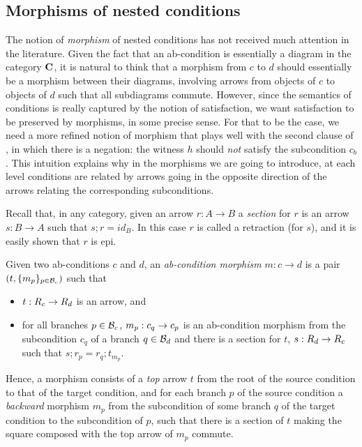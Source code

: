 \subsection{Morphisms of nested conditions}
\medskip\noindent The notion of \emph{morphism} of nested conditions has not received much attention in the literature. Given the fact that an ab-condition is essentially a diagram in the category $\mathbf{C}$, it is natural to think that a morphism from $c$ to $d$ should essentially be a morphism between their diagrams, involving arrows from objects of $c$ to objects of $d$ such that all subdiagrams commute. However, since the semantics of conditions is really captured by the notion of satisfaction, we want satisfaction to be preserved by morphisms, in some precise sense. For that to be the case, we need a more refined notion of morphism that plays well with the second clause of , in which there is a negation: the witness $h$ should \emph{not} satisfy the subcondition $c_b$. 
This intuition explains why in the morphisms we are going to introduce, at each level conditions are related by arrows going in the opposite direction of the arrows relating the corresponding subconditions.  

Recall that, in any category, given an arrow $r: A \to B$ a \emph{section} for $r$ is an arrow $s: B \to A$ such that $s;r = id_B$. In this case $r$ is called a retraction (for $s$), and it is easily shown that $r$ is epi.

\begin{definition}
  Given two ab-conditions $c$ and $d$, an \emph{ab-condition morphism} $m: c \to d$
  is a pair $(t,\{{m_p}\}_{p\in \mathcal{B}_c})$ such that   
  \begin{itemize}
    \item $t:R_c\rightarrow R_d$ is an arrow, and 
  \item  for all branches $p\in \mathcal{B}_c$, $m_p:c_q\rightarrow c_p$ is an ab-condition morphism from the subcondition $c_q$ of a branch $q\in \mathcal{B}_d$ and there is a section for $t$, $s:R_d\rightarrow R_c$ such that $s; r_p = r_q;t_{m_p}$.
  \end{itemize}
\end{definition}
%
Hence, a morphism consists of a \emph{top} arrow $t$ from the root of the source condition to that of the target condition, and for each branch $p$ of the source condition a \emph{backward} morphism $m_p$ from the subcondition of some branch $q$ of the target condition to the subcondition of $p$, such that there is a section of $t$ making the square composed with the top arrow of $m_p$ commute. 


